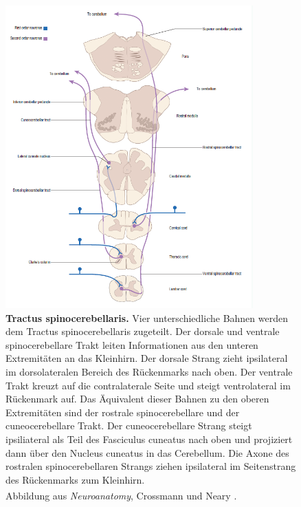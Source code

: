\documentclass[12pt,a4paper,pdftex]{article}
\begin{document}
\begin{figure}[H]
    \centering
    \includegraphics[width=0.85\textwidth]{pictures/Bilder_Laura/spinocerebellar_tract.PNG}
    \caption[Tractus spinocerebellaris]{\textbf{Tractus spinocerebellaris.} Vier unterschiedliche Bahnen werden dem Tractus spinocerebellaris zugeteilt. Der dorsale und ventrale spinocerebellare Trakt leiten Informationen aus den unteren Extremitäten an das Kleinhirn. Der dorsale Strang zieht ipsilateral im dorsolateralen Bereich des Rückenmarks nach oben. Der ventrale Trakt kreuzt auf die contralaterale Seite und steigt ventrolateral im Rückenmark auf. Das Äquivalent dieser Bahnen zu den oberen Extremitäten sind der rostrale spinocerebellare und der cuneocerebellare Trakt. Der cuneocerebellare Strang steigt ipsiliateral als Teil des Fasciculus cuneatus nach oben und projiziert dann über den Nucleus cuneatus in das Cerebellum. Die Axone des rostralen spinocerebellaren Strangs ziehen ipsilateral im Seitenstrang des Rückenmarks zum Kleinhirn. \\
    Abbildung aus \textit{Neuroanatomy}, Crossmann und Neary \textsuperscript{\cite[8]{crossman2014neuroanatomy}}.}
    \label{fig:tr_spinocerebellaris}
\end{figure}
\end{document}
